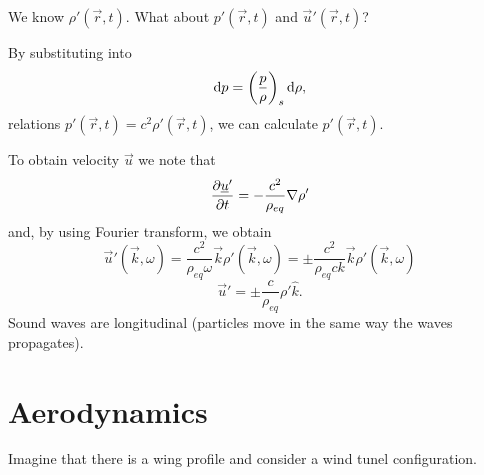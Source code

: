 \documentclass[../main.tex]{subfiles}
\begin{document}
    We know $\rho'(\vec r, t)$. What about $p'(\vec r, t)$ and $\vec u'(\vec r, t)$?

    By substituting into
    \begin{displaymath}
      \mathrm{d} p = \left( \frac{p}{\rho} \right)_s \mathrm{d} \rho, 
    \end{displaymath}
    relations $p'(\vec r, t) = c^2 \rho'(\vec r, t)$, we can calculate $p'(\vec r, t)$.

    To obtain velocity $\vec u$ we note that
    \begin{displaymath}
      \frac{\partial \underline{u}'}{\partial t}  = - \frac{c^2}{\rho_{eq}} \nabla \rho'
    \end{displaymath}
    and, by using Fourier transform, we obtain
    \begin{displaymath}
      \vec u' (\vec k, \omega) = \frac{c^2}{\rho_{eq}\omega}\vec k \rho'(\vec k, \omega) 
      = \pm\frac{c^2}{\rho_{eq} ck } \vec k \rho'(\vec k, \omega) 
    \end{displaymath}
    \begin{displaymath}
      \vec u' = \pm  \frac{c}{\rho_{eq}} \rho' \hat k.
    \end{displaymath}
    Sound waves are longitudinal (particles move in the same way the waves propagates).

    \section{Aerodynamics}

    Imagine that there is a wing profile and consider a wind tunel configuration.

    \begin{figure}[h]
      \centering
      \label{fig:}
    \end{figure}
\end{document}
